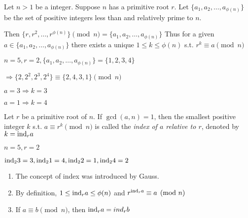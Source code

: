 Let $n > 1$ be a integer.
Suppose $n$ has a primitive root $r$.
Let $\{a_1, a_2, \dots, a_{\phi(n)}\}$ be the set of positive integers less than 
and relatively prime to $n$.

Then $\{r, r^2, \dots, r^{\phi(n)}\} \pmod{n} = \{a_1, a_2, \dots, a_{\phi(n)}\}$
Thus  for a given $a \in \{a_1, a_2, \dots, a_{\phi(n)}\}$ there exists
a unique $1 \leq k \leq \phi(n)$ s.t. $r^k \equiv a \pmod n$

\begin{eg}
    $n = 5, r = 2, \{a_1, a_2, \dots, a_{\phi(n)}\} = \{1, 2, 3, 4\}$

    $\Rightarrow \{2, 2^2, 2^3, 2^4\} \equiv \{2, 4, 3, 1\} \pmod n$

    $a = 3 \Rightarrow  k = 3$

    $a = 1 \Rightarrow  k = 4$
\end{eg}

\begin{definition}
    Let $r$ be a primitive root of $n$. If $\gcd(a, n) = 1$,
    then the smallest positive integer $k$ s.t. $a \equiv r^k \pmod n$ is 
    called the \emph{index of $a$ relative to $r$}, denoted by $k = \text{ind}_r a$
\end{definition}

\begin{eg}
    $n=5, r=2$

    $\text{ind}_2 3 = 3, \text{ind}_2 1 = 4, \text{ind}_2 2 = 1, \text{ind}_2 4 = 2$
\end{eg}

\begin{remark}
    \hfill\break
    \begin{enumerate}
        \item The concept of index was introduced by Gauss.
        \item By definition, $1 \leq \text{ind}_r a \leq \phi(n)$ and $r^{\text{ind}_r a} \equiv a \pmod n$
        \item If $a \equiv b \pmod n$, then $\text{ind}_r a = ind_r b$
    \end{enumerate}
\end{remark}

